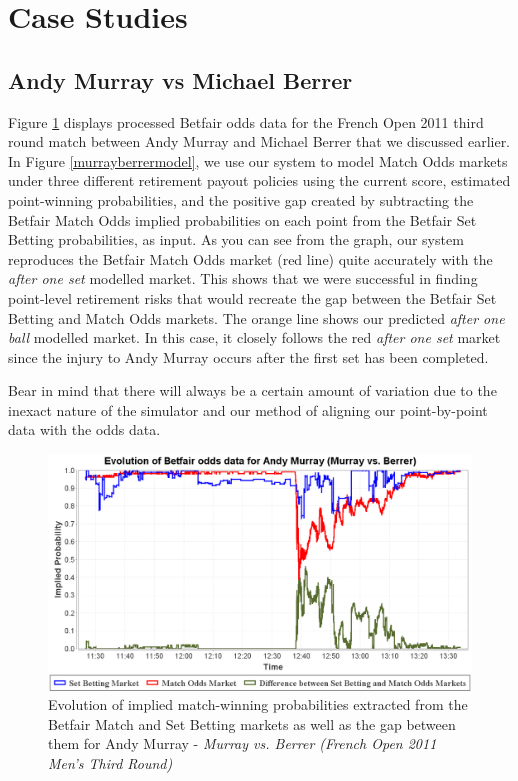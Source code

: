 \documentclass[authoryear, 12pt]{elsarticle}
\begin{document}
\section{Case Studies}

\subsection{Andy Murray vs Michael Berrer}

Figure \ref{murrayberrer2} displays processed Betfair odds data for the French Open 2011 third round match between Andy Murray and Michael Berrer that we discussed earlier.  In Figure \ref{murrayberrermodel}, we use our system to model Match Odds markets under three different retirement payout policies using the current score, estimated point-winning probabilities, and the positive gap created by subtracting the Betfair Match Odds implied probabilities on each point from the Betfair Set Betting probabilities, as input.  As you can see from the graph, our system reproduces the Betfair Match Odds market (red line) quite accurately with the \textit{after one set} modelled market.  This shows that we were successful in finding point-level retirement risks that would recreate the gap between the Betfair Set Betting and Match Odds markets.  The orange line shows our predicted \textit{after one ball} modelled market.  In this case, it closely follows the red \textit{after one set} market since the injury to Andy Murray occurs after the first set has been completed.

Bear in mind that there will always be a certain amount of variation due to the inexact nature of the simulator and our method of aligning our point-by-point data with the odds data.

\begin{figure}[H]
  \centering \includegraphics[width=12.3cm]{matches/murrayberrer}
  \caption{Evolution of implied match-winning probabilities extracted from the Betfair Match and Set Betting markets as well as the gap between them for Andy Murray - \textit{Murray vs. Berrer (French Open 2011 Men's Third Round)}}
  \label{murrayberrer2}
\end{figure}
\end{document}

